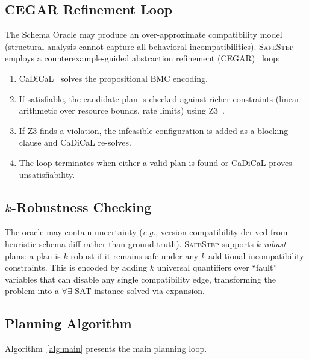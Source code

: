 \documentclass[10pt,twocolumn]{article}
\newcommand{\safestep}{\textsc{SafeStep}}
\newcommand{\eg}{\textit{e.g.}}
\begin{document}
\subsection{CEGAR Refinement Loop}
\label{sec:cegar}

The Schema Oracle may produce an over-approximate compatibility
model (structural analysis cannot capture all behavioral
incompatibilities). \safestep{} employs a counterexample-guided
abstraction refinement (CEGAR)~\cite{clarke-cegar-2000} loop:

\begin{enumerate}[leftmargin=*,nosep]
  \item CaDiCaL~\cite{cadical} solves the propositional BMC
        encoding.
  \item If satisfiable, the candidate plan is checked against
        richer constraints (linear arithmetic over resource
        bounds, rate limits) using Z3~\cite{z3}.
  \item If Z3 finds a violation, the infeasible configuration
        is added as a blocking clause and CaDiCaL re-solves.
  \item The loop terminates when either a valid plan is found
        or CaDiCaL proves unsatisfiability.
\end{enumerate}

\subsection{$k$-Robustness Checking}

The oracle may contain uncertainty (\eg, version compatibility
derived from heuristic schema diff rather than ground truth).
\safestep{} supports \emph{$k$-robust} plans: a plan is
$k$-robust if it remains safe under any $k$ additional
incompatibility constraints. This is encoded by adding
$k$ universal quantifiers over ``fault'' variables that can
disable any single compatibility edge, transforming the
problem into a $\forall\exists$-SAT instance solved via
expansion.

\subsection{Planning Algorithm}

Algorithm~\ref{alg:main} presents the main planning loop.
\end{document}
